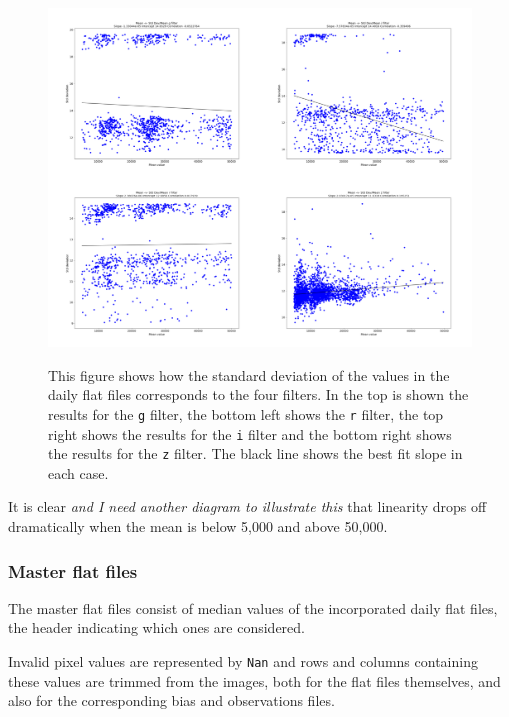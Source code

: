 \begin{figure}[!htbp]
\begin{center}
\includegraphics[scale=0.25]{images/Corr.png} \\
\end{center}   
\caption{This figure shows how the standard deviation of the values in the
daily flat files corresponds to the four filters. In the top is shown the
results for the \texttt{g} filter, the bottom left shows the \texttt{r} filter,
the top right shows the results for the \texttt{i} filter and the bottom right
shows the results for the \texttt{z} filter. The black line shows the best fit
slope in each case.}
\protect\label{fig:ffcorr}
\end{figure}

It is clear \textit{and I need another diagram to illustrate this} that
linearity drops off dramatically when the mean is below 5,000 and above 50,000.
\subsubsection{Master flat files}
\protect\label{section:masterflatfiles}

The master flat files consist of median values of the incorporated daily flat
files, the header indicating which ones are considered.

Invalid pixel values are represented by \texttt{Nan} and rows and columns
containing these values are trimmed from the images, both for the flat files
themselves, and also for the corresponding bias and observations files.

